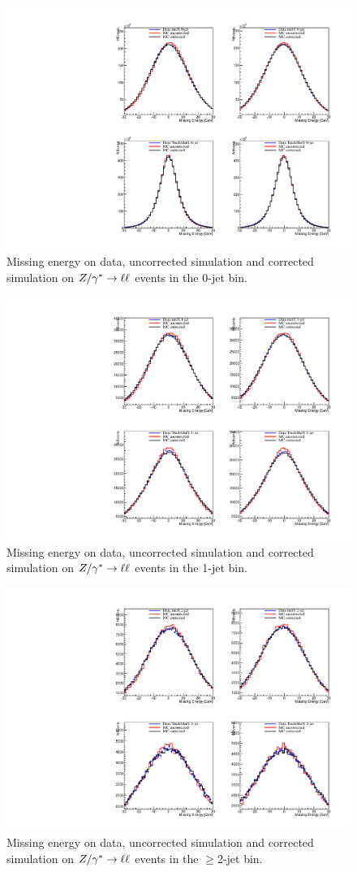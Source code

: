 \begin{figure}[hbt]
\begin{center}
\includegraphics[width=0.75\linewidth]{figures/test0_met_zll.pdf} 
\caption{\label{fig:test0_met_zll} Missing energy on data, 
uncorrected simulation and corrected simulation on $Z/\gamma^*\to\ell\ell$ events in 
the 0-jet bin.}
\end{center}
\end{figure}


\begin{figure}[hbt]
\begin{center}
\includegraphics[width=0.75\linewidth]{figures/test1_met_zll.pdf} 
\caption{\label{fig:test1_met_zll} Missing energy on data, 
uncorrected simulation and corrected simulation on $Z/\gamma^*\to\ell\ell$ events in 
the 1-jet bin.}
\end{center}
\end{figure}

\begin{figure}[hbt]
\begin{center}
\includegraphics[width=0.75\linewidth]{figures/test2_met_zll.pdf} 
\caption{\label{fig:test2_met_zll} Missing energy on data, 
uncorrected simulation and corrected simulation on $Z/\gamma^*\to\ell\ell$ events in 
the $\geq$2-jet bin.}
\end{center}
\end{figure}


